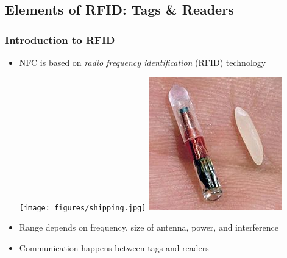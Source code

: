 \documentclass[unknownkeysallowed]{beamer}
\begin{document}
\subsection{Elements of RFID: Tags \& Readers}
\begin{frame}
  \frametitle{Introduction to RFID}
    \begin{center}\begin{minipage}{.9\textwidth}
      \begin{itemize}
        \item{NFC is based on \textit{radio frequency identification} (RFID) technology}

        \begin{center}
           \texttt{[image: figures/shipping.jpg]}
           \includegraphics[width=\linewidth,height=0.3\textheight,keepaspectratio]{figures/Microchip_rfid_rice.jpg}
        \end{center}
        \pause
        \item{Range depends on frequency, size of antenna, power, and interference}
        \pause
        \item{Communication happens between tags and readers}
      \end{itemize}
    \end{minipage}\end{center}
\end{frame}
\end{document}
